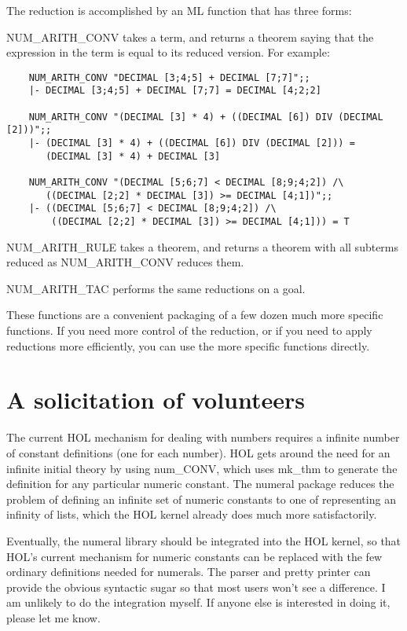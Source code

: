 The reduction is accomplished by an ML function that has three forms:

{\ml NUM\_ARITH\_CONV} takes a term, and returns a theorem saying that the
expression in the term is equal to its reduced version.  For example:

\begin{hol}\begin{verbatim}
    NUM_ARITH_CONV "DECIMAL [3;4;5] + DECIMAL [7;7]";;
    |- DECIMAL [3;4;5] + DECIMAL [7;7] = DECIMAL [4;2;2]

    NUM_ARITH_CONV "(DECIMAL [3] * 4) + ((DECIMAL [6]) DIV (DECIMAL [2]))";;
    |- (DECIMAL [3] * 4) + ((DECIMAL [6]) DIV (DECIMAL [2])) =
       (DECIMAL [3] * 4) + DECIMAL [3]

    NUM_ARITH_CONV "(DECIMAL [5;6;7] < DECIMAL [8;9;4;2]) /\
       ((DECIMAL [2;2] * DECIMAL [3]) >= DECIMAL [4;1])";;
    |- ((DECIMAL [5;6;7] < DECIMAL [8;9;4;2]) /\
        ((DECIMAL [2;2] * DECIMAL [3]) >= DECIMAL [4;1])) = T
\end{verbatim}\end{hol}

{\ml NUM\_ARITH\_RULE} takes a theorem, and returns a theorem with all subterms
reduced as {\ml NUM\_ARITH\_CONV} reduces them.

{\ml NUM\_ARITH\_TAC} performs the same reductions on a goal.

These functions are a convenient packaging of a few dozen much more specific
functions.  If you need more control of the reduction, or if you need to apply
reductions more efficiently, you can use the more specific functions directly.

\section{A solicitation of volunteers}

The current HOL mechanism for dealing with numbers requires a infinite number
of constant definitions (one for each number).  HOL gets around the need for an
infinite initial theory by using {\ml num\_CONV}, which uses {\ml mk\_thm} to
generate the definition for any particular numeric constant.  The numeral
package reduces the problem of defining an infinite set of numeric constants to
one of representing an infinity of lists, which the HOL kernel already does
much more satisfactorily.

Eventually, the numeral library should be integrated into the HOL kernel, so
that HOL's current mechanism for numeric constants can be replaced with the
few ordinary definitions needed for numerals.  The parser and pretty printer
can provide the obvious syntactic sugar so that most users won't see a
difference.  I am unlikely to do the integration myself.  If anyone else is
interested in doing it, please let me know.
